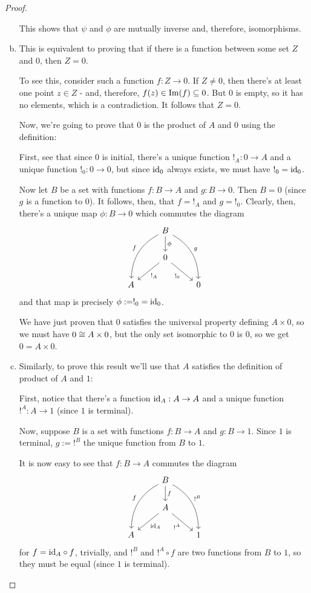 \begin{proof}
\begin{enumerate}[(a)]
		This shows that $\psi$ and $\phi$ are mutually inverse and, therefore, isomorphisms.
		
		\item This is equivalent to proving that if there is a function between some set $Z$ and $0$, then $Z=0$.
		
		To see this, consider such a function $f:Z\to 0$. If $Z\neq 0$, then there's at least one point $z\in Z$ - and, therefore, $f(z)\in \operatorname{Im}(f)\subseteq 0$. But $0$ is empty, so it has no elements, which is a contradiction. It follows that $Z=0$.
		
		Now, we're going to prove that $0$ is the product of $A$ and $0$ using the definition:
		
		First, see that since $0$ is initial, there's a unique function $!_A:0\to A$ and a unique function $!_0:0\to 0$, but since ${\rm id}_0$ always exists, we must have $!_0={\rm id}_0$.
		
		Now let $B$ be a set with functions $f:B\to A$ and $g:B\to 0$. Then $B=0$ (since $g$ is a function to $0$). It follows, then, that $f=!_A$ and $g=!_0$. Clearly, then, there's a unique map $\phi:B\to 0$ which commutes the diagram
		\[\begin{tikzcd}
		& B \arrow[d, "\phi"] \arrow[ldd, "f"', bend right] \arrow[rdd, "g", bend left] &   \\
		& 0 \arrow[ld, "!_A"] \arrow[rd, "!_0"']                                        &   \\
		A &                                                                               & 0
		\end{tikzcd}\]and that map is precisely $\phi:=!_0={\rm id}_0$. 
		
		We have just proven that $0$ satisfies the universal property defining $A\times 0$, so we must have $0\cong A\times 0$, but the only set isomorphic to $0$ is $0$, so we get $0=A\times 0$.
		
		\item Similarly, to prove this result we'll use that $A$ satisfies the definition of product of $A$ and $1$:
		
		First, notice that there's a function ${\rm id}_A:A\to A$ and a unique function $!^A:A\to 1$ (since $1$ is terminal).
		
		Now, suppose $B$ is a set with functions $f:B\to A$ and $g:B\to 1$. Since $1$ is terminal, $g:=!^B$ the unique function from $B$ to $1$. 
		
		It is now easy to see that $f:B\to A$ commutes the diagram
		\[\begin{tikzcd}
		& B \arrow[d, "f"] \arrow[ldd, "f"', bend right] \arrow[rdd, "!^B", bend left] &   \\
		& A \arrow[ld, "\id_A"] \arrow[rd, "!^A"']                                     &   \\
		A &                                                                              & 1
		\end{tikzcd}\]for $f={\rm id}_A\circ f$, trivially, and $!^B$ and $!^A\circ f$ are two functions from $B$ to $1$, so they must be equal (since $1$ is terminal).
		

\end{enumerate}
\end{proof}
